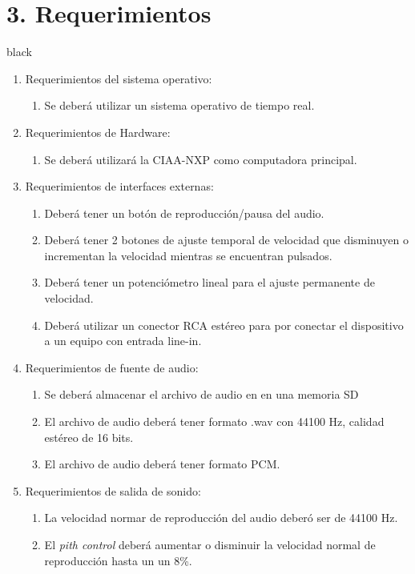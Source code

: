 \documentclass[11pt]{charter}
\begin{document}
\section{3. Requerimientos}
\label{sec:requerimientos}
\begin{consigna}{black}
\begin{enumerate}
\item Requerimientos del sistema operativo:
	\begin{enumerate}
	\item Se deberá utilizar un sistema operativo de tiempo real.
	\end{enumerate}
\item Requerimientos de Hardware:
	\begin{enumerate}
	\item  Se deberá utilizará la CIAA-NXP como computadora principal.
	\end{enumerate}
\item Requerimientos de interfaces externas:
	\begin{enumerate}
	\item Deberá tener un botón de reproducción/pausa del audio.
	\item Deberá tener 2 botones de ajuste temporal de velocidad que disminuyen o incrementan la velocidad mientras se encuentran pulsados.
	\item Deberá tener un potenciómetro lineal para el ajuste permanente de velocidad.
	\item Deberá utilizar un conector RCA estéreo para por conectar el dispositivo a un equipo con entrada  line-in.
	\end{enumerate}
\item Requerimientos de fuente de audio:
	\begin{enumerate}
	\item Se deberá almacenar el archivo de audio en en una memoria SD
	\item El archivo de audio deberá tener formato .wav con 44100 Hz, calidad estéreo de 16 bits.
	\item El archivo de audio deberá tener formato PCM.
	\end{enumerate}
\item Requerimientos de salida de sonido:
	\begin{enumerate}
	\item La velocidad normar de reproducción del audio deberó ser de 44100 Hz.
	\item El \textit{pith control} deberá aumentar o disminuir la velocidad normal de reproducción hasta un un 8\%.

\end{enumerate}
\end{enumerate}
\end{consigna}
\end{document}
